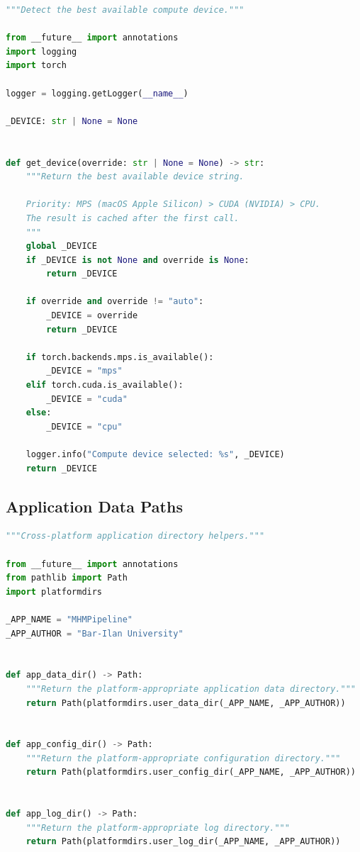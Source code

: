 \documentclass[12pt]{article}
\begin{document}
\begin{lstlisting}[language=Python, caption={platform\_/gpu.py --- GPU detection cascade}]
"""Detect the best available compute device."""

from __future__ import annotations
import logging
import torch

logger = logging.getLogger(__name__)

_DEVICE: str | None = None


def get_device(override: str | None = None) -> str:
    """Return the best available device string.

    Priority: MPS (macOS Apple Silicon) > CUDA (NVIDIA) > CPU.
    The result is cached after the first call.
    """
    global _DEVICE
    if _DEVICE is not None and override is None:
        return _DEVICE

    if override and override != "auto":
        _DEVICE = override
        return _DEVICE

    if torch.backends.mps.is_available():
        _DEVICE = "mps"
    elif torch.cuda.is_available():
        _DEVICE = "cuda"
    else:
        _DEVICE = "cpu"

    logger.info("Compute device selected: %s", _DEVICE)
    return _DEVICE
\end{lstlisting}

\subsection{Application Data Paths}

\begin{lstlisting}[language=Python, caption={platform\_/paths.py --- cross-platform app directories}]
"""Cross-platform application directory helpers."""

from __future__ import annotations
from pathlib import Path
import platformdirs

_APP_NAME = "MHMPipeline"
_APP_AUTHOR = "Bar-Ilan University"


def app_data_dir() -> Path:
    """Return the platform-appropriate application data directory."""
    return Path(platformdirs.user_data_dir(_APP_NAME, _APP_AUTHOR))


def app_config_dir() -> Path:
    """Return the platform-appropriate configuration directory."""
    return Path(platformdirs.user_config_dir(_APP_NAME, _APP_AUTHOR))


def app_log_dir() -> Path:
    """Return the platform-appropriate log directory."""
    return Path(platformdirs.user_log_dir(_APP_NAME, _APP_AUTHOR))
\end{lstlisting}
\end{document}
